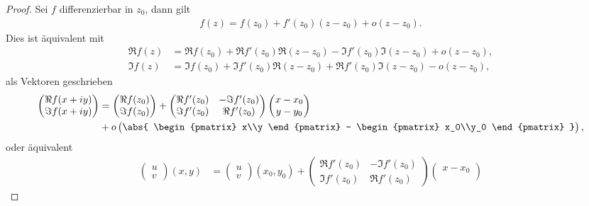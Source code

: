 \begin{proof}
Sei $f$ differenzierbar in $z_0$, dann gilt
\begin{align*}
f(z) = f(z_0) + f'(z_0)(z-z_0) + o(z-z_0).
\end{align*}
Dies ist äquivalent mit
\begin{align*}
\Re f(z) &= \Re f(z_0) + \Re f'(z_0)\Re (z-z_0) - \Im f'(z_0)\Im (z-z_0) +
o(z-z_0),\\
\Im f(z) &= \Im f(z_0) + \Im f'(z_0)\Re (z-z_0) + \Re f'(z_0)\Im (z-z_0) -
o(z-z_0),
\end{align*}
als Vektoren geschrieben
\begin{align*}
\begin{pmatrix}
\Re f(x+iy)\\
\Im f(x+iy)
\end{pmatrix}
&=
\begin{pmatrix}
\Re f(z_0)\\
\Im f(z_0)
\end{pmatrix}
+
\begin{pmatrix}
\Re f'(z_0) & -\Im f'(z_0)\\
\Im f'(z_0) & \Re f'(z_0)
\end{pmatrix}
\begin{pmatrix}
x-x_0\\
y-y_0
\end{pmatrix}
\\ &+
o
\begin{pmatrix}
\abs{
\begin{pmatrix}
x\\y
\end{pmatrix}
-
\begin{pmatrix}
x_0\\y_0
\end{pmatrix}
}
\end{pmatrix},
\end{align*}
oder äquivalent
\begin{align*}
\begin{pmatrix}
u\\v
\end{pmatrix}(x,y)
&=
\begin{pmatrix}
u\\v
\end{pmatrix}(x_0,y_0)
+
\begin{pmatrix}
\Re f'(z_0) & -\Im f'(z_0)\\
\Im f'(z_0) & \Re f'(z_0)
\end{pmatrix}
\begin{pmatrix}
x-x_0\\

\end{pmatrix}
\end{align*}
\end{proof}

